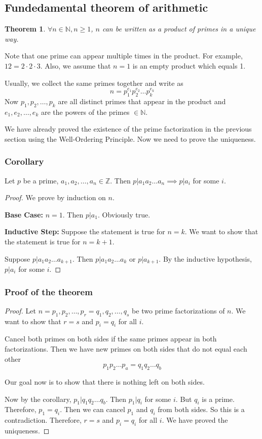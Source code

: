 \documentclass[letterpaper,12pt,oneside]{article}
\newtheorem{theorem}{Theorem}
\begin{document}
\subsection{Fundedamental theorem of arithmetic}
\begin{theorem}
    $\forall n \in \mathbb{N}, n \ge 1$, $n$ can be written as a product of primes in a unique way.
\end{theorem}
Note that one prime can appear multiple times in the product. For example, $12 = 2 \cdot 2 \cdot 3$. Also, we assume that $n=1$ is an empty product which equals 1.

Usually, we collect the same primes together and write as \[
    n=p_1^{e_1}p_2^{e_2}\dots p_k^{e_k}
\]
Now $p_1, p_2, \dots, p_k$ are all distinct primes that appear in the product
and $e_1, e_2, \dots, e_k$ are the powers of the primes $\in \mathbb{N}$.

We have already proved the existence of the prime factorization in the previous
section using the Well-Ordering Principle. Now we need to prove the uniqueness.

\subsubsection{Corollary}
Let $p$ be a prime, $a_1, a_2, \dots, a_n \in \mathbb{Z}$. Then $p |
    a_1a_2\dots a_n \implies p | a_i$ for some $i$. \begin{proof}
    We prove by induction on $n$.

    \textbf{Base Case:} $n=1$. Then $p | a_1$. Obviously true.

    \textbf{Inductive Step:} Suppose the statement is true for $n=k$. We want to show that the statement is true for $n=k+1$.

    Suppose $p | a_1a_2\dots a_{k+1}$. Then $p | a_1a_2\dots a_k$ or $p | a_{k+1}$.
    By the inductive hypothesis, $p | a_i$ for some $i$.
\end{proof}

\subsubsection{Proof of the theorem}
\begin{proof}
    Let $n = p_1, p_2, \ldots, p_r = q_1, q_2, \ldots, q_s$ be two prime factorizations of $n$. We want to show that $r = s$ and $p_i = q_i$ for all $i$.

    Cancel both primes on both sides if the same primes appear in both
    factorizations. Then we have new primes on both sides that do not equal each
    other\[
        p_1p_2\dots p_a = q_1q_2\dots q_b
    \]

    Our goal now is to show that there is nothing left on both sides.

    Now by the corollary, $p_1 | q_1q_2\dots q_b$. Then $p_1 | q_i$ for some $i$.
    But $q_i$ is a prime. Therefore, $p_1 = q_i$. Then we can cancel $p_1$ and
    $q_i$ from both sides. So this is a contradiction. Therefore, $r = s$ and $p_i
        = q_i$ for all $i$. We have proved the uniqueness.
\end{proof}
\end{document}

